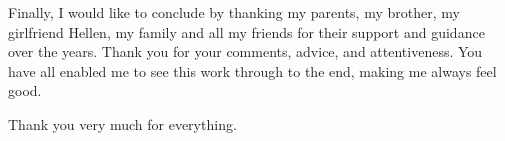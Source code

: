 Finally, I would like to conclude by thanking my parents, my brother, my girlfriend Hellen, my family and all my friends for their support and guidance over the years. Thank you for your comments, advice, and attentiveness. You have all enabled me to see this work through to the end, making me always feel good.

Thank you very much for everything.